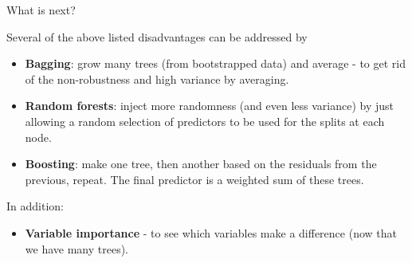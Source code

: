 \documentclass[10pt,ignorenonframetext,]{beamer}
\providecommand{\tightlist}{%
  \setlength{\itemsep}{0pt}\setlength{\parskip}{0pt}}
\begin{document}
\begin{frame}

\begin{block}{What is next?}

\vspace{2mm}

Several of the above listed disadvantages can be addressed by

\begin{itemize}
\item
  \textbf{Bagging}: grow many trees (from bootstrapped data) and average
  - to get rid of the non-robustness and high variance by averaging.
\item
  \textbf{Random forests}: inject more randomness (and even less
  variance) by just allowing a random selection of predictors to be used
  for the splits at each node.
\item
  \textbf{Boosting}: make one tree, then another based on the residuals
  from the previous, repeat. The final predictor is a weighted sum of
  these trees.
\end{itemize}

\vspace{1mm}

In addition:

\begin{itemize}
\tightlist
\item
  \textbf{Variable importance} - to see which variables make a
  difference (now that we have many trees).
\end{itemize}

\end{block}

\end{frame}
\end{document}

